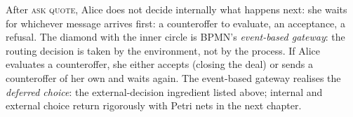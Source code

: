 After \textsc{ask quote}, Alice does not decide internally what happens next: she waits for whichever message arrives first: a counteroffer to evaluate, an acceptance, a refusal. The diamond with the inner circle is BPMN's \emph{event-based gateway}: the routing decision is taken by the environment, not by the process. If Alice evaluates a counteroffer, she either accepts (closing the deal) or sends a counteroffer of her own and waits again. The event-based gateway realises the \emph{deferred choice}: the external-decision ingredient listed above; internal and external choice return rigorously with Petri nets in the next chapter.
